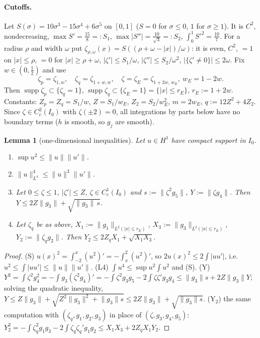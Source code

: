 \documentclass[11pt]{article}
\newtheorem{lemma}[theorem]{Lemma}
\theoremstyle{remark}\newtheorem{remark}[theorem]{Remark}
\newcommand{\nrm}[1]{\lVert #1\rVert}
\begin{document}
\paragraph{Cutoffs.} Let $S(\sigma)=10\sigma^3-15\sigma^4+6\sigma^5$ on $[0,1]$ ($S=0$ for $\sigma\le0$, $1$ for $\sigma\ge1$). It is $C^2$, nondecreasing, $\max S'=\frac{15}8=:S_1$, $\max|S''|=\frac{10}{\sqrt3}=:S_2$, $\int_0^1S'^2=\frac{10}7$. For a radius $\rho$ and width $\omega$ put $\zeta_{\rho,\omega}(x)=S((\rho+\omega-|x|)/\omega)$: it is even, $C^2$, $=1$ on $|x|\le\rho$, $=0$ for $|x|\ge\rho+\omega$, $|\zeta'|\le S_1/\omega$, $|\zeta''|\le S_2/\omega^2$, $|\{\zeta'\ne0\}|\le2\omega$. Fix $w\in(0,\frac12)$ and use
\[
\zeta_p=\zeta_{1,w},\quad \zeta_q=\zeta_{1+w,w},\quad \zeta=\zeta_E=\zeta_{1+2w,\,w_E},\ w_E=1-2w .
\]
Then $\operatorname{supp}\zeta_p\subset\{\zeta_q=1\}$, $\operatorname{supp}\zeta_q\subset\{\zeta_E=1\}=\{|x|\le r_E\}$, $r_E:=1+2w$. Constants: $Z_p=Z_q=S_1/w$, $Z=S_1/w_E$, $Z_2=S_2/w_E^2$, $m=2w_E$, $q:=12Z^2+4Z_2$. Since $\zeta\in C^2_c(I_0)$ with $\zeta(\pm2)=0$, all integrations by parts below have no boundary terms ($h$ is smooth, so $g_j$ are smooth).

\begin{lemma}[one-dimensional inequalities]\label{lem:1d}
Let $u\in H^1$ have compact support in $I_0$.
\begin{enumerate}
\item[(S)] $\sup u^2\le\nrm u\nrm{u'}$.
\item[(L4)] $\nrm u_{L^4}^4\le\nrm u^3\nrm{u'}$.
\item[(Y)] Let $0\le\zeta\le1$, $|\zeta'|\le Z$, $\zeta\in C^1_c(I_0)$ and $s:=\nrm{\zeta^2g_5}$, $Y:=\nrm{\zeta g_4}$. Then $Y\le 2Z\nrm{g_3}+\sqrt{\nrm{g_3}\,s}$.
\item[(Y$_2$)] Let $\zeta_q$ be as above, $X_1:=\nrm{g_1}_{L^2(|x|\le r_E)}$, $X_3:=\nrm{g_3}_{L^2(|x|\le r_E)}$, $Y_2:=\nrm{\zeta_qg_2}$. Then $Y_2\le 2Z_qX_1+\sqrt{X_1X_3}$.
\end{enumerate}
\end{lemma}
\begin{proof}
(S) $u(x)^2=\int_{-2}^x(u^2)'=-\int_x^2(u^2)'$, so $2u(x)^2\le 2\int|uu'|$, i.e.\ $u^2\le\int|uu'|\le\nrm u\nrm{u'}$. (L4) $\int u^4\le\sup u^2\int u^2$ and (S). (Y) $Y^2=\int\zeta^2g_4^2=-\int g_3(\zeta^2g_4)'=-\int\zeta^2g_3g_5-2\int\zeta\zeta'g_3g_4\le\nrm{g_3}s+2Z\nrm{g_3}Y$; solving the quadratic inequality, $Y\le Z\nrm{g_3}+\sqrt{Z^2\nrm{g_3}^2+\nrm{g_3}s}\le2Z\nrm{g_3}+\sqrt{\nrm{g_3}s}$. (Y$_2$) the same computation with $(\zeta_q,g_1,g_2,g_3)$ in place of $(\zeta,g_3,g_4,g_5)$: $Y_2^2=-\int\zeta_q^2g_1g_3-2\int\zeta_q\zeta_q'g_1g_2\le X_1X_3+2Z_qX_1Y_2$.
\end{proof}
\end{document}
